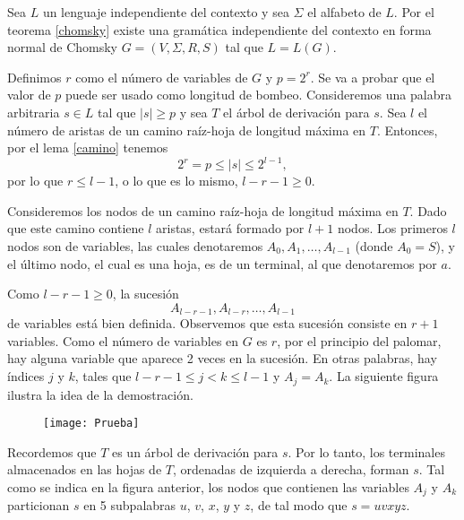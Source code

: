 \documentclass[twoside]{article}
\begin{document}
\begin{dem}
Sea $L$ un lenguaje independiente del contexto y sea $\Sigma$ el alfabeto de $L$. Por el teorema \ref{chomsky} existe una gramática independiente del contexto en forma normal de Chomsky $G=(V,\Sigma,R,S)$ tal que $L=L(G)$.

Definimos $r$ como el número de variables de $G$ y $p=2^r$. Se va a probar que el valor de $p$ puede ser usado como longitud de bombeo. Consideremos una palabra arbitraria $s\in L$ tal que $|s|\geq p$ y sea $T$ el árbol de derivación para $s$. Sea $l$ el número de aristas de un camino raíz-hoja de longitud máxima en $T$. Entonces, por el lema \ref{camino} tenemos
$$2^r=p\leq |s|\leq 2^{l-1},$$
por lo que $r\leq l-1$, o lo que es lo mismo, $l-r-1\geq 0$. 

Consideremos los nodos de un camino raíz-hoja de longitud máxima en $T$. Dado que este camino contiene $l$ aristas, estará formado por $l+1$ nodos. Los primeros $l$ nodos son de variables, las cuales denotaremos $A_0,A_1,\dots, A_{l-1}$ (donde $A_0=S$), y el último nodo, el cual es una hoja, es de un terminal, al que denotaremos por $a$. 

Como  $l-r-1\geq 0$, la sucesión $$A_{l-r-1}, A_{l-r},\dots, A_{l-1}$$
de variables está bien definida. Observemos que esta sucesión consiste en $r+1$ variables. Como el número de variables en $G$ es $r$, por el principio del palomar, hay alguna variable que aparece 2 veces en la sucesión. En otras palabras, hay índices $j$ y $k$, tales que $l-r-1\leq j<k\leq l-1$ y $A_j=A_k$. La siguiente figura ilustra la idea de la demostración.

\begin{figure}[h!]
\texttt{[image: Prueba]}
\end{figure}

Recordemos que $T$ es un árbol de derivación para $s$. Por lo tanto, los terminales almacenados en las hojas de $T$, ordenadas de izquierda a derecha, forman $s$. Tal como se indica en la figura anterior, los nodos que contienen las variables $A_j$ y $A_k$ particionan $s$ en 5 subpalabras $u$, $v$, $x$, $y$ y $z$, de tal modo que $s=uvxyz$.


\end{dem}
\end{document}
